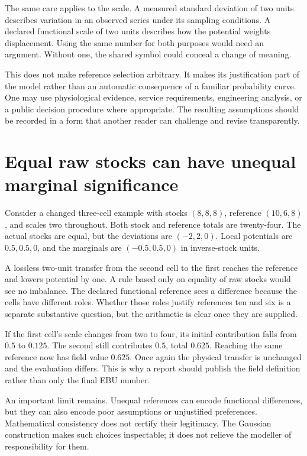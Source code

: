 The same care applies to the scale. A measured standard deviation of two units describes variation in an observed series under its sampling conditions. A declared functional scale of two units describes how the potential weights displacement. Using the same number for both purposes would need an argument. Without one, the shared symbol could conceal a change of meaning.

This does not make reference selection arbitrary. It makes its justification part of the model rather than an automatic consequence of a familiar probability curve. One may use physiological evidence, service requirements, engineering analysis, or a public decision procedure where appropriate. The resulting assumptions should be recorded in a form that another reader can challenge and revise transparently.

\section{Equal raw stocks can have unequal marginal significance}

Consider a changed three-cell example with stocks \((8,8,8)\), reference \((10,6,8)\), and scales two throughout. Both stock and reference totals are twenty-four. The actual stocks are equal, but the deviations are \((-2,2,0)\). Local potentials are \(0.5,0.5,0\), and the marginals are \((-0.5,0.5,0)\) in inverse-stock units.

A lossless two-unit transfer from the second cell to the first reaches the reference and lowers potential by one. A rule based only on equality of raw stocks would see no imbalance. The declared functional reference sees a difference because the cells have different roles. Whether those roles justify references ten and six is a separate substantive question, but the arithmetic is clear once they are supplied.

If the first cell's scale changes from two to four, its initial contribution falls from \(0.5\) to \(0.125\). The second still contributes \(0.5\), total \(0.625\). Reaching the same reference now has field value \(0.625\). Once again the physical transfer is unchanged and the evaluation differs. This is why a report should publish the field definition rather than only the final EBU number.

An important limit remains. Unequal references can encode functional differences, but they can also encode poor assumptions or unjustified preferences. Mathematical consistency does not certify their legitimacy. The Gaussian construction makes such choices inspectable; it does not relieve the modeller of responsibility for them.

